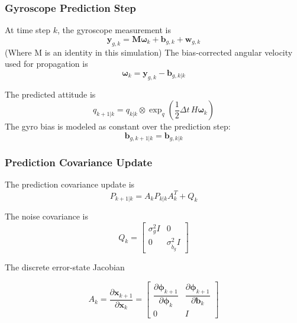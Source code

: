 \documentclass[conference,onecolumn,draftclsnofoot]{IEEEtran}
\begin{document}
\subsubsection{Gyroscope Prediction Step}

At time step \(k\), the gyroscope measurement is
\begin{equation}
\mathbf y_{g,k}
=
\boldsymbol{M \omega}_k
+
\mathbf b_{g,k}
+
\mathbf w_{g,k}
\end{equation}
(Where M is an identity in this simulation)
The bias-corrected angular velocity used for propagation is
\begin{equation}
\boldsymbol{\omega}_k
=
\mathbf y_{g,k}
-
\mathbf b_{g,k|k}
\end{equation}

The predicted attitude is
\begin{equation}
q_{k+1|k}
=
q_{k|k}
\otimes
\exp_q
\left(
\frac{1}{2} \Delta t\,H\boldsymbol{\omega}_k
\right)
\end{equation}
The gyro bias is modeled as constant over the prediction step:
\begin{equation}
\mathbf b_{g,k+1|k}
=
\mathbf b_{g,k|k}
\end{equation}

\subsubsection{Prediction Covariance Update}

The prediction covariance update is
\begin{equation}
P_{k+1|k}
=
A_kP_{k|k}A_k^T
+
Q_k
\end{equation}

The noise covariance is
\begin{equation}
Q_k
=
\begin{bmatrix}
\sigma_g^2 I & 0\\
0 & \sigma_{\dot b_g}^2 I
\end{bmatrix}
\end{equation}

The discrete error-state Jacobian

\begin{equation}
A_k
=
\frac{\partial  \boldsymbol{x}_{k+1}}{\partial  \boldsymbol{x}_k}
=
\begin{bmatrix}
\dfrac{\partial \boldsymbol{\phi}_{k+1}}
      {\partial \boldsymbol{\phi}_{k}}
&
\dfrac{\partial \boldsymbol{\phi}_{k+1}}
      {\partial \boldsymbol{b}_{k}}
\\[2ex]
    0
&
    I
\end{bmatrix}
\end{equation}
\end{document}
